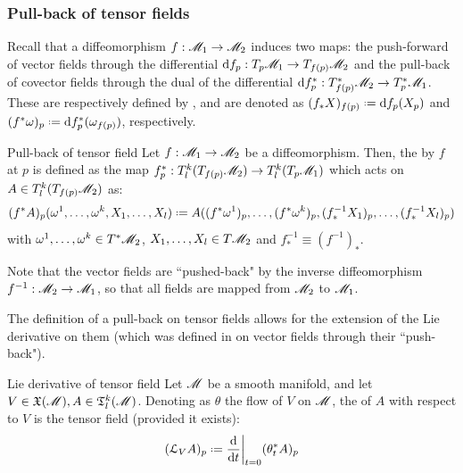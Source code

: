 
\subsubsection{Pull-back of tensor fields}

Recall that a diffeomorphism $ f : \mathscr{M}_1 \rightarrow \mathscr{M}_2 $ induces two maps: the push-forward of vector fields through the differential $ \mathrm{d} f_p : T_p\mathscr{M}_1 \rightarrow T_{f(p)}\mathscr{M}_2 $ and the pull-back of covector fields through the dual of the differential $ \mathrm{d} f_p^* : T_{f(p)}^*\mathscr{M}_2 \rightarrow T_p^*\mathscr{M}_1 $. These are respectively defined by , and are denoted as $ (f_*X)_{f(p)} \defeq \dd f_p(X_p) $ and $ (f^*\omega)_p \defeq \dd f_p^*(\omega_{f(p)}) $, respectively.

\begin{definition}{Pull-back of tensor field}{}
  Let $ f : \mathscr{M}_1 \rightarrow \mathscr{M}_2 $ be a diffeomorphism. Then, the  by $ f $ at $ p $ is defined as the map $ f^*_p : T^k_l(T_{f(p)}\mathscr{M}_2) \rightarrow T^k_l(T_p\mathscr{M}_1) $ which acts on $ A \in T^k_l(T_{f(p)}\mathscr{M}_2) $ as:
  \begin{equation}
    (f^*A)_p(\omega^1 , \dots , \omega^k , X_1 , \dots , X_l) \defeq A((f^*\omega^1)_p , \dots , (f^*\omega^k)_p , (f^{-1}_* X_1)_p , \dots , (f^{-1}_* X_l)_p)
    \label{eq:tens-pb}
  \end{equation}
  with $ \omega^1 , \dots , \omega^k \in T^*\mathscr{M}_2 $, $ X_1 , \dots , X_l \in T\mathscr{M}_2 $ and $ f^{-1}_* \equiv (f^{-1})_* $.
\end{definition}

Note that the vector fields are ``pushed-back" by the inverse diffeomorphism $ f^{-1} : \mathscr{M}_2 \rightarrow \mathscr{M}_1 $, so that all fields are mapped from $ \mathscr{M}_2 $ to $ \mathscr{M}_1 $.

The definition of a pull-back on tensor fields allows for the extension of the Lie derivative on them (which was defined in  on vector fields through their ``push-back").

\begin{definition}{Lie derivative of tensor field}{}
  Let $ \mathscr{M} $ be a smooth manifold, and let $ V \in \mathfrak{X}(\mathscr{M}) , A \in \mathfrak{T}^{k}_{l}(\mathscr{M}) $. Denoting as $ \theta $ the flow of $ V $ on $ \mathscr{M} $, the  of $ A $ with respect to $ V $ is the tensor field (provided it exists):
  \begin{equation}
    (\ld_V A)_p \defeq \frac{\dd}{\dd t} \bigg\vert_{t = 0} (\theta_t^* A)_p
  \end{equation}
\end{definition}

